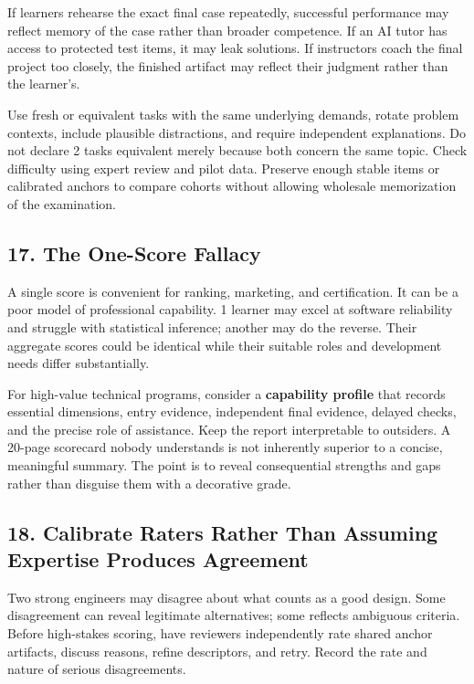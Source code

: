 If learners rehearse the exact final case repeatedly, successful performance may reflect memory of the case rather than broader competence. If an AI tutor has access to protected test items, it may leak solutions. If instructors coach the final project too closely, the finished artifact may reflect their judgment rather than the learner's.

Use fresh or equivalent tasks with the same underlying demands, rotate problem contexts, include plausible distractions, and require independent explanations. Do not declare 2 tasks equivalent merely because both concern the same topic. Check difficulty using expert review and pilot data. Preserve enough stable items or calibrated anchors to compare cohorts without allowing wholesale memorization of the examination.

\subsection*{17. The One-Score Fallacy}

A single score is convenient for ranking, marketing, and certification. It can be a poor model of professional capability. 1 learner may excel at software reliability and struggle with statistical inference; another may do the reverse. Their aggregate scores could be identical while their suitable roles and development needs differ substantially.

For high-value technical programs, consider a \textbf{capability profile} that records essential dimensions, entry evidence, independent final evidence, delayed checks, and the precise role of assistance. Keep the report interpretable to outsiders. A 20-page scorecard nobody understands is not inherently superior to a concise, meaningful summary. The point is to reveal consequential strengths and gaps rather than disguise them with a decorative grade.

\subsection*{18. Calibrate Raters Rather Than Assuming Expertise Produces Agreement}

Two strong engineers may disagree about what counts as a good design. Some disagreement can reveal legitimate alternatives; some reflects ambiguous criteria. Before high-stakes scoring, have reviewers independently rate shared anchor artifacts, discuss reasons, refine descriptors, and retry. Record the rate and nature of serious disagreements.

